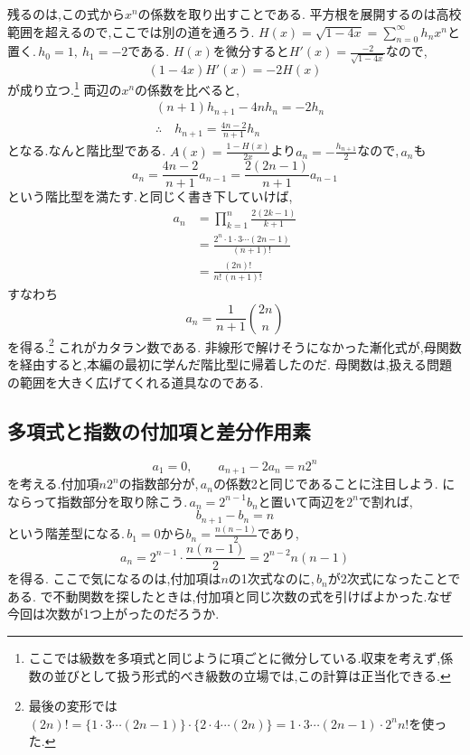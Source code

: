 残るのは,この式から$x^n$の係数を取り出すことである.
平方根を展開するのは高校範囲を超えるので,ここでは別の道を通ろう.
$H(x)=\sqrt{1-4x}=\sum_{n=0}^{\infty}h_nx^n$と置く.\,$h_0=1,\ h_1=-2$である.
$H(x)$を微分すると$H'(x)=\frac{-2}{\sqrt{1-4x}}$なので,
\[
  (1-4x)H'(x)=-2H(x)
\]
が成り立つ.\footnote{ここでは級数を多項式と同じように項ごとに微分している.収束を考えず,係数の並びとして扱う形式的べき級数の立場では,この計算は正当化できる.}
両辺の$x^n$の係数を比べると,
\begin{align*}
  &(n+1)h_{n+1}-4nh_n=-2h_n\\
  &\therefore\quad h_{n+1}=\frac{4n-2}{n+1}h_n
\end{align*}
となる.なんと階比型である.
$A(x)=\frac{1-H(x)}{2x}$より$a_n=-\frac{h_{n+1}}{2}$なので,\,$a_n$も
\[
  a_n=\frac{4n-2}{n+1}a_{n-1}=\frac{2(2n-1)}{n+1}a_{n-1}
\]
という階比型を満たす.と同じく書き下していけば,
\begin{align*}
  a_n&=\prod_{k=1}^{n}\frac{2(2k-1)}{k+1}\\
  &=\frac{2^n\cdot1\cdot3\cdots(2n-1)}{(n+1)!}\\
  &=\frac{(2n)!}{n!\,(n+1)!}
\end{align*}
すなわち
\[
  a_n=\frac{1}{n+1}\binom{2n}{n}
\]
を得る.\footnote{最後の変形では$(2n)!=\{1\cdot3\cdots(2n-1)\}\cdot\{2\cdot4\cdots(2n)\}=1\cdot3\cdots(2n-1)\cdot2^nn!$を使った.}
これがカタラン数である.
非線形で解けそうになかった漸化式が,母関数を経由すると,本編の最初に学んだ階比型に帰着したのだ.
母関数は,扱える問題の範囲を大きく広げてくれる道具なのである.

\subsection{多項式と指数の付加項と差分作用素}\label{節：多項式と指数の付加項と差分作用素}

\[
  a_1=0,\qquad a_{n+1}-2a_n=n2^n
\]
を考える.付加項$n2^n$の指数部分が,\,$a_n$の係数2と同じであることに注目しよう.
にならって指数部分を取り除こう.\,$a_n=2^{n-1}b_n$と置いて両辺を$2^n$で割れば,
\[
  b_{n+1}-b_n=n
\]
という階差型になる.\,$b_1=0$から$b_n=\frac{n(n-1)}{2}$であり,
\[
  a_n=2^{n-1}\cdot\frac{n(n-1)}{2}=2^{n-2}n(n-1)
\]
を得る.
ここで気になるのは,付加項は$n$の1次式なのに,\,$b_n$が2次式になったことである.
で不動関数を探したときは,付加項と同じ次数の式を引けばよかった.なぜ今回は次数が1つ上がったのだろうか.

